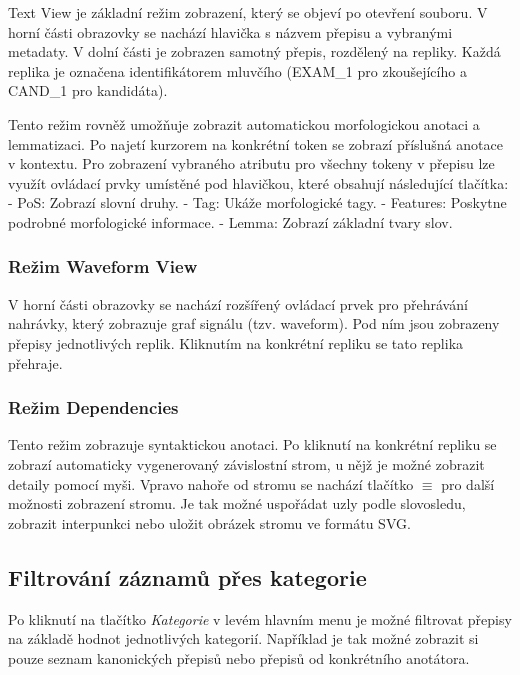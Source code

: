 \documentclass[
]{article}
\begin{document}
Text View je základní režim zobrazení, který se objeví po otevření
souboru. V horní části obrazovky se nachází hlavička s názvem přepisu a
vybranými metadaty. V dolní části je zobrazen samotný přepis, rozdělený
na repliky. Každá replika je označena identifikátorem mluvčího (EXAM\_1
pro zkoušejícího a CAND\_1 pro kandidáta).

Tento režim rovněž umožňuje zobrazit automatickou morfologickou anotaci
a lemmatizaci. Po najetí kurzorem na konkrétní token se zobrazí
příslušná anotace v kontextu. Pro zobrazení vybraného atributu pro
všechny tokeny v přepisu lze využít ovládací prvky umístěné pod
hlavičkou, které obsahují následující tlačítka: - PoS: Zobrazí slovní
druhy. - Tag: Ukáže morfologické tagy. - Features: Poskytne podrobné
morfologické informace. - Lemma: Zobrazí základní tvary slov.

\hypertarget{reux17eim-waveform-view}{%
\subsubsection{Režim Waveform View}\label{reux17eim-waveform-view}}

V horní části obrazovky se nachází rozšířený ovládací prvek pro
přehrávání nahrávky, který zobrazuje graf signálu (tzv. waveform). Pod
ním jsou zobrazeny přepisy jednotlivých replik. Kliknutím na konkrétní
repliku se tato replika přehraje.

\hypertarget{reux17eim-dependencies}{%
\subsubsection{Režim Dependencies}\label{reux17eim-dependencies}}

Tento režim zobrazuje syntaktickou anotaci. Po kliknutí na konkrétní
repliku se zobrazí automaticky vygenerovaný závislostní strom, u nějž je
možné zobrazit detaily pomocí myši. Vpravo nahoře od stromu se nachází
tlačítko $\equiv$ pro další možnosti zobrazení stromu. Je tak možné uspořádat
uzly podle slovosledu, zobrazit interpunkci nebo uložit obrázek stromu
ve formátu SVG.

\hypertarget{filtrovuxe1nuxed-zuxe1znamux16f-pux159es-kategorie}{%
\subsection{Filtrování záznamů přes
kategorie}\label{filtrovuxe1nuxed-zuxe1znamux16f-pux159es-kategorie}}

Po kliknutí na tlačítko \emph{Kategorie} v levém hlavním menu je možné
filtrovat přepisy na základě hodnot jednotlivých kategorií. Například je
tak možné zobrazit si pouze seznam kanonických přepisů nebo přepisů od
konkrétního anotátora.
\end{document}
